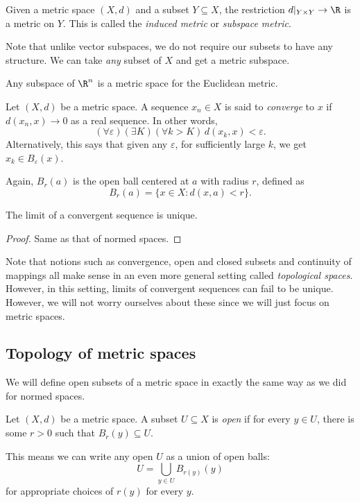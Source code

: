 \documentclass[a4paper]{article}
\begin{document}
\begin{defi}
  Given a metric space $(X, d)$ and a subset $Y\subseteq X$, the restriction $d|_{Y \times Y} \to \R$ is a metric on $Y$. This is called the \emph{induced metric} or \emph{subspace metric}.
\end{defi}
Note that unlike vector subspaces, we do not require our subsets to have any structure. We can take \emph{any} subset of $X$ and get a metric subspace.

\begin{eg}
  Any subspace of $\R^n$ is a metric space for the Euclidean metric.
\end{eg}

\begin{defi}[Convergence]
  Let $(X, d)$ be a metric space. A sequence $x_n \in X$ is said to \emph{converge} to $x$ if $d(x_n, x) \to 0$ as a real sequence. In other words,
  \[
    (\forall \varepsilon)(\exists K)(\forall k > K)\, d(x_k, x) < \varepsilon.
  \]
  Alternatively, this says that given any $\varepsilon$, for sufficiently large $k$, we get $x_k \in B_\varepsilon(x)$.
\end{defi}
Again, $B_r(a)$ is the open ball centered at $a$ with radius $r$, defined as
\[
  B_r(a) = \{x \in X: d(x, a) < r\}.
\]
\begin{prop}
  The limit of a convergent sequence is unique.
\end{prop}

\begin{proof}
  Same as that of normed spaces.
\end{proof}
Note that notions such as convergence, open and closed subsets and continuity of mappings all make sense in an even more general setting called \emph{topological spaces}. However, in this setting, limits of convergent sequences can fail to be unique. However, we will not worry ourselves about these since we will just focus on metric spaces.

\subsection{Topology of metric spaces}
We will define open subsets of a metric space in exactly the same way as we did for normed spaces.
\begin{defi}
  Let $(X, d)$ be a metric space. A subset $U\subseteq X$ is \emph{open} if for every $y \in U$, there is some $r > 0$ such that $B_r(y) \subseteq U$.
\end{defi}
This means we can write any open $U$ as a union of open balls:
\[
  U = \bigcup_{y \in U} B_{r(y)} (y)
\]
for appropriate choices of $r(y)$ for every $y$.
\end{document}

